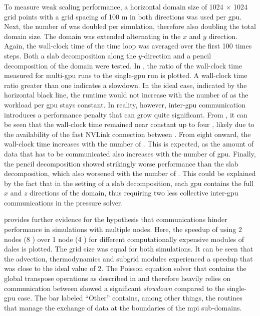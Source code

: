 To measure weak scaling performance, a horizontal domain size of 1024 $\times$ 1024 grid points with a grid spacing of 100 m in both directions was used per \acrshort{gpu}. Next, the number of  was doubled per simulation, therefore also doubling the total domain size. The domain was extended alternating in the $x$ and $y$ direction. Again, the wall-clock time of the time loop was averaged over the first 100 times steps. Both a slab decomposition along the $y$-direction and a pencil decomposition of the domain were tested. In , the ratio of the wall-clock time measured for multi-\acrshort{gpu} runs to the single-\acrshort{gpu} run is plotted. A wall-clock time ratio greater than one indicates a slowdown. In the ideal case, indicated by the horizontal black line, the runtime would not increase with the number of  as the workload per \acrshort{gpu} stays constant. In reality, however, inter-\acrshort{gpu} communication introduces a performance penalty that can grow quite significant. From , it can be seen that the wall-clock time remained near constant up to four , likely due to the availability of the fast NVLink connection between . From eight  onward, the wall-clock time increases with the number of . This is expected, as the amount of data that has to be communicated also increases with the number of \acrshort{gpu}. Finally, the pencil decomposition showed strikingly worse performance than the slab decomposition, which also worsened with the number of . This could be explained by the fact that in the setting of a slab decomposition, each \acrshort{gpu} contains the full $x$ and $z$ directions of the domain, thus requiring two less collective inter-\acrshort{gpu} communications in the pressure solver.

 provides further evidence for the hypothesis that communications hinder performance in simulations with multiple nodes. Here, the speedup of using 2 nodes (8 ) over 1 node (4 ) for different computationally expensive modules of \acrshort{dales} is plotted. The grid size was equal for both simulations. It can be seen that the advection, thermodynamics and subgrid modules experienced a speedup that was close to the ideal value of 2. The Poisson equation solver that contains the global transpose operations as described in  and therefore heavily relies on communication between  showed a significant \emph{slowdown} compared to the single-\acrshort{gpu} case. The bar labeled ``Other'' contains, among other things, the routines that manage the exchange of data at the boundaries of the \acrshort{mpi} sub-domains. 

